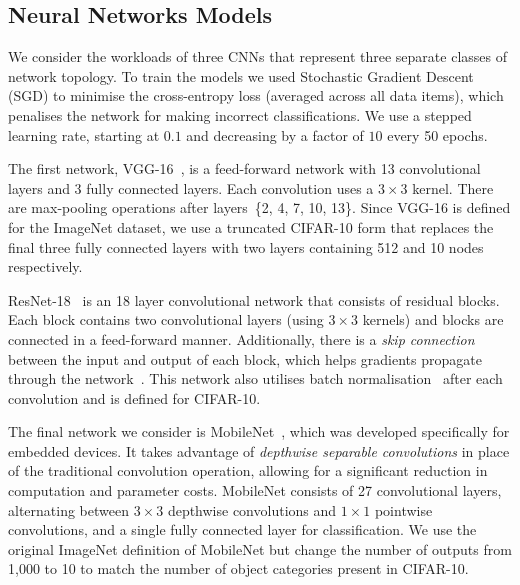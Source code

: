 \documentclass[conference]{IEEEtran}
\begin{document}
\subsection{Neural Networks Models}\label{sec:hyperparameters}

We consider the workloads of three CNNs that represent three separate classes of network topology. To train the models we used Stochastic Gradient Descent (SGD) to minimise the cross-entropy loss (averaged across all data items), which penalises the network for making incorrect classifications. We use a stepped learning rate, starting at $0.1$ and decreasing by a factor of $10$ every 50 epochs. 

The first network, VGG-16~\cite{vgg}, is a feed-forward network with 13 convolutional layers and 3 fully connected layers. Each convolution uses a $3\times3$ kernel. There are max-pooling operations after layers~\{2, 4, 7, 10, 13\}. Since VGG-16 is defined for the ImageNet dataset, we use a truncated CIFAR-10 form that replaces the final three fully connected layers with two layers containing 512 and 10 nodes respectively.

ResNet-18~\cite{he2016deep} is an 18 layer convolutional network that consists of residual blocks. Each block contains two convolutional layers (using $3\times3$ kernels) and blocks are connected in a feed-forward manner. Additionally, there is a \textit{skip connection} between the input and output of each block, which helps gradients propagate through the network~\cite{shatteredgradients2017}. This network also utilises batch normalisation~\cite{ioffe2015batch} after each convolution and is defined for CIFAR-10.

The final network we consider is MobileNet~\cite{mobilenet}, which was developed specifically for embedded devices. It takes advantage of \textit{depthwise separable convolutions} in place of the traditional convolution operation, allowing for a significant reduction in computation and parameter costs. MobileNet consists of 27 convolutional layers, alternating between $3\times3$ depthwise convolutions and $1\times1$ pointwise convolutions, and a single fully connected layer for classification. We use the original ImageNet definition of MobileNet but change the number of outputs from 1,000 to 10 to match the number of object categories present in CIFAR-10.

\end{document}
